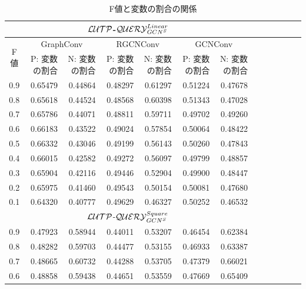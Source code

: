 \begin{table}[tb]
\caption{F値と変数の割合の関係}\label{tbl:variable_ratio}
\centering
\begin{tabular}{|c|rr|rr|rr|rr|rr|rr|}\hline
  \multicolumn{7}{|c|}{${\cal LUTP}$-${\cal QUERY}_{GCN^S}^{Linear}$} \\ \hline
  \multirow{2}{*}{F値} & \multicolumn{2}{|c|}{GraphConv} & \multicolumn{2}{|c|}{RGCNConv} & \multicolumn{2}{|c|}{GCNConv} \\ \cline{2-7}
  & P: 変数の割合 & N: 変数の割合 & P: 変数の割合 & N: 変数の割合 & P: 変数の割合 & N: 変数の割合 \\ \hline
  0.9 &   0.65479 &       0.44864 &       0.48297 &       0.61297 &       0.51224 &       0.47678 \\
  0.8 &   0.65618 &       0.44524 &       0.48568 &       0.60398 &       0.51343 &       0.47028 \\
  0.7 &   0.65786 &       0.44071 &       0.48811 &       0.59711 &       0.49702 &       0.49260 \\
  0.6 &   0.66183 &       0.43522 &       0.49024 &       0.57854 &       0.50064 &       0.48422 \\
  0.5 &   0.66332 &       0.43046 &       0.49199 &       0.56143 &       0.50260 &       0.47843 \\
  0.4 &   0.66015 &       0.42582 &       0.49272 &       0.56097 &       0.49799 &       0.48857 \\
  0.3 &   0.65904 &       0.42116 &       0.49446 &       0.52904 &       0.49900 &       0.48447 \\
  0.2 &   0.65975 &       0.41460 &       0.49543 &       0.50154 &       0.50081 &       0.47680 \\
  0.1 &   0.64320 &       0.40777 &       0.49629 &       0.46327 &       0.50252 &       0.46532 \\ \hline\hline
  \multicolumn{7}{|c|}{${\cal LUTP}$-${\cal QUERY}_{GCN^S}^{Square}$} \\ \hline
  0.9 &   0.47923 &       0.58944 &       0.44011 &       0.53207 &       0.46454 &       0.62384 \\
  0.8 &   0.48282 &       0.59703 &       0.44477 &       0.53155 &       0.46933 &       0.63387 \\
  0.7 &   0.48665 &       0.60732 &       0.44288 &       0.53705 &       0.47379 &       0.66021 \\
  0.6 &   0.48858 &       0.59438 &       0.44651 &       0.53559 &       0.47669 &       0.65409 \\

\end{tabular}
\end{table}
